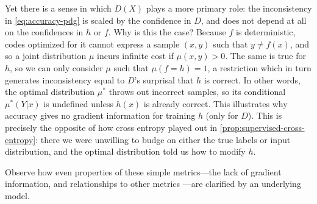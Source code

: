 \documentclass[twoside]{article}
\theoremstyle{plain}
\theoremstyle{definition}
\begin{document}
Yet there is a sense in which
$D(X)$ plays a more primary role: the inconsistency in \eqref{eq:accuracy-pdg} is scaled by the confidence in $D$, and does not depend at all on the confidences in $h$ or $f$.
%
Why is this the case? Because $f$ is deterministic, codes optimized for it cannot express a sample $(x,y)$ such that $y \ne f(x)$, and so a joint distribution $\mu$ incurs infinite cost if $\mu(x,y) > 0$.
The same is true for $h$, so
we can only consider $\mu$
such that $\mu(f \!=\! h) \!=\! 1$, a restriction which
in turn generates inconsistency equal to $D$'s surprisal that $h$ is correct.
In other words, the optimal distribution $\mu^*$ throws out incorrect samples, so its conditional $\mu^*(Y|x)$ is undefined unless $h(x)$ is already correct.
This illustrates why accuracy gives no gradient information for training $h$ (only for $D$).
This is precisely
the opposite of how cross entropy played out in \cref{prop:supervised-cross-entropy}:
 there we were unwilling to budge on either the true labels or input distribution, and the optimal distribution told us how to modify $h$.
%

Observe how even properties of these simple metrics---the lack of gradient information, and relationships to
 	other metrics%
	---are clarified by an underlying model.
\end{document}
